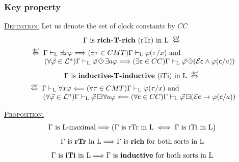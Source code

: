 \documentclass[xcolor=x11names]{beamer}
\renewcommand{\emph}[1]{\textbf{#1}}
\renewcommand{\Diamond}{\scalebox{.9}{\raisebox{-.4ex}{\rotatebox{45}{$\Box$}}}}
\newcommand{\defekv}[1][.1]{\hspace{#1cm}\overset{\textup{\tiny def}}{ \Leftrightarrow }\hspace{#1cm}}
\newcommand{\lthen}{\rightarrow}
\newcommand{\forallin}[2]{(\forall #1 \in #2)}
\newcommand{\existsin}[2]{(\exists #1 \in #2)}
\newcommand{\derives}[1][]{\vdash_{\mathrm{#1}}}
\newcommand{\BoxTemplate}[1]{{#1} \mathop{\Box\hspace{-1.35ex} \raisebox{.5ex}{\scalebox{.5}{$\lthen$}}}}
\newcommand{\DiamondTemplate}[1]{#1\hspace{-.2ex} \mathop{\Diamond\hspace{-1.35ex} \raisebox{.4ex}{\scalebox{.5}{$\land$}}}\,}
\begin{document}
\begin{frame}[t]
	\frametitle{Key property}
\footnotesize
\underline{\textsc{Definition:}} Let us denote the set of clock constants by $CC$
\begin{multline*}
   \textup{$\Gamma$ is \emph{rich-T-rich} (rTr) in $\mathrm{L}$}
       \defekv  \\
   \begin{array}{l}
     \defekv
      \Gamma \derives[L]\exists x \varphi \Longrightarrow \existsin {\tau}{CMT} \Gamma \derives[L] \varphi(\tau/x) \textup{ and }
   \\ \qquad \forallin {\vec \varphi}{\mathcal L^n} \Gamma \derives[L]\DiamondTemplate{\vec\varphi}\exists a \varphi \Longrightarrow \existsin {\mathsf c}{CC} \Gamma \derives[L]  \DiamondTemplate {\vec\varphi}(\mathcal E \mathsf c \land \varphi(\mathsf c /a))
   \end{array}
\end{multline*}
\begin{multline*}
   \textup{$\Gamma$ is \emph{inductive-T-inductive} (iTi) in $\mathrm{L}$}
       \defekv  \\
   \begin{array}{l}
     \defekv
      \Gamma \derives[L]\forall x \varphi \Longleftarrow \forallin {\tau}{CMT} \Gamma \derives[L] \varphi(\tau/x) \textup{ and }
   \\  \qquad \forallin {\vec \varphi}{\mathcal L^n} \Gamma \derives[L]\BoxTemplate{\vec\varphi}\forall a \varphi \Longleftarrow \forallin {\mathsf c}{CC} \Gamma \derives[L]  \BoxTemplate {\vec\varphi}(\mathcal E \mathsf c \lthen \varphi(\mathsf c /a))
   \end{array}
\end{multline*}


\underline{\textsc{Proposition:}} \[ \textup{$\Gamma$ is $\mathrm{L}$-maximal} \mathrel{\Longrightarrow} \big( \textup{$\Gamma$ is rTr in $\mathrm{L}$} \iff \textup{$\Gamma$ is iTi in $\mathrm{L}$} \big) \]
\[ \textup{$\Gamma$ is \emph{rTr} in $\mathrm{L}$} \Longrightarrow \textup{$\Gamma$ is \emph{rich} for both sorts in $\mathrm{L}$} \]
\[ \textup{$\Gamma$ is \emph{iTi} in $\mathrm{L}$} \Longrightarrow \textup{$\Gamma$ is \emph{inductive} for both sorts in $\mathrm{L}$} \]
\end{frame}
\end{document}
